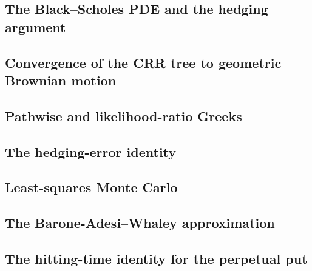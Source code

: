 \documentclass[12pt]{amsart}
\begin{document}
\subsection{The Black--Scholes PDE and the hedging argument}


\subsection{Convergence of the CRR tree to geometric Brownian motion}


\subsection{Pathwise and likelihood-ratio Greeks}


\subsection{The hedging-error identity}


\subsection{Least-squares Monte Carlo}


\subsection{The Barone-Adesi--Whaley approximation}


\subsection{The hitting-time identity for the perpetual put}


\clearpage
\end{document}
